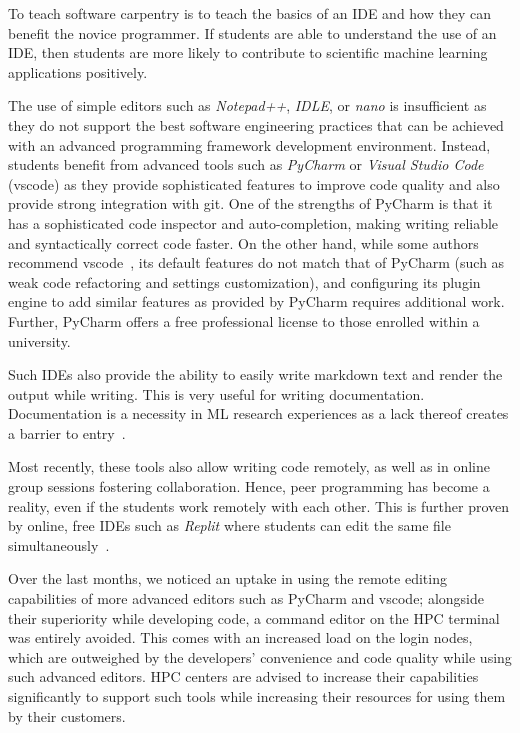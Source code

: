 \documentclass[utf8]{FrontiersinVancouver} %
\begin{document}
To teach software carpentry is to teach the basics of an IDE and how they can benefit the novice programmer. If students are able to understand the use of an IDE, then students are more likely to contribute to scientific machine learning applications positively.

The use of simple editors such as {\em Notepad++}, {\em IDLE}, or {\em nano} is insufficient as they do not support the best software engineering practices that can be achieved with an advanced programming framework development environment. Instead, students benefit from advanced tools such as {\em PyCharm} or {\em Visual Studio Code} (vscode) as they provide sophisticated features to improve code quality and also provide strong integration with git. One of the strengths of PyCharm is that it has a sophisticated code inspector and auto-completion, making writing reliable and syntactically correct code faster. On the other hand, while some authors recommend vscode~\cite{tan_chen}, its default features do not match that of PyCharm (such as weak code refactoring and settings customization), and configuring its plugin engine to add similar features as provided by PyCharm requires additional work. Further, PyCharm offers a free professional license to those enrolled within a university.

Such IDEs also provide the ability to easily write markdown text and render the output while writing. This is very useful for writing documentation. Documentation is a necessity in ML research experiences as a lack thereof creates a barrier to entry~\cite{konigstorfer}.

Most recently, these tools also allow writing code remotely, as well as in online group sessions fostering collaboration. Hence, peer programming has become a reality, even if the students work remotely with each other. This is further proven by online, free IDEs such as {\em Replit} where students can edit the same file simultaneously~\cite{Kovtaniuk2022}.

Over the last months, we noticed an uptake in using the remote editing capabilities of more advanced editors such as PyCharm and vscode; alongside their superiority while developing code, a command editor on the HPC terminal was entirely avoided. This comes with an increased load on the login nodes, which are outweighed by the developers' convenience and code quality while using such advanced editors. HPC centers are advised to increase their capabilities significantly to support such tools while increasing their resources for using them by their customers.
\end{document}
